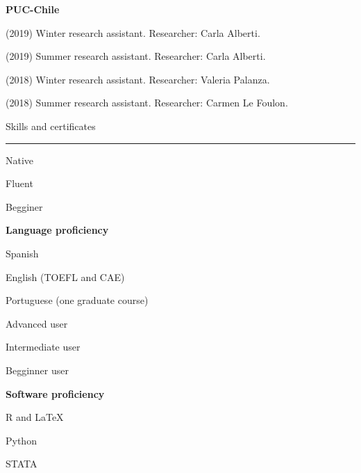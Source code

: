 \documentclass[a4paper, 12pt]{article}
\begin{document}
\begin{multicols}{2}

\textbf{PUC-Chile}

\columnbreak

\begin{flushright}

(2019) Winter research assistant. Researcher: Carla Alberti.

(2019) Summer research assistant. Researcher: Carla Alberti.

(2018) Winter research assistant. Researcher: Valeria Palanza.

(2018) Summer research assistant. Researcher: Carmen Le Foulon.

\end{flushright}

\end{multicols}





\large Skills and certificates

\smallskip

\hrule

\normalsize

\begin{multicols}{2}

\hfill

Native

Fluent

Begginer

\columnbreak

\begin{flushright}

\textbf{Language proficiency}

\medskip

Spanish

English (TOEFL and CAE)

Portuguese (one graduate course)

\end{flushright}

\end{multicols}

\begin{multicols}{2}

\hfill

Advanced user

Intermediate user

Begginner user

\columnbreak

\begin{flushright}

\textbf{Software proficiency}

\medskip

\textsf{R} and \LaTeX

\textsf{Python}

\textsf{STATA}

\end{flushright}

\end{multicols}
\end{document}
